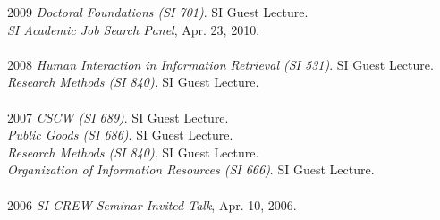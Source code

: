 \documentclass[9pt]{extarticle}
\makeatletter
\renewcommand{\section}{%
  \@startsection{section}{1}{0em}{\baselineskip}{3pt}{\large\bfseries\textsc}}
\makeatother
\begin{document}
\begin{tabbing}
2009 \hspace{0.3in}\= \emph{Doctoral Foundations (SI 701)}. SI Guest Lecture. \\
\> \emph{SI Academic Job Search Panel}, Apr. 23, 2010. \\\\

2008 \hspace{0.3in}\= \emph{Human Interaction in Information Retrieval (SI 531)}. SI Guest Lecture. \\
\> \emph{Research Methods (SI 840)}. SI Guest Lecture. \\\\

2007 \hspace{0.3in}\= \emph{CSCW (SI 689)}. SI Guest Lecture. \\
\> \emph{Public Goods (SI 686)}. SI Guest Lecture. \\
\> \emph{Research Methods (SI 840)}. SI Guest Lecture. \\
\> \emph{Organization of Information Resources (SI 666)}. SI Guest Lecture. \\\\

2006 \hspace{0.3in}\= \emph{SI CREW Seminar Invited Talk}, Apr. 10, 2006. \\
\end{tabbing}



%
%
%
\end{document}
